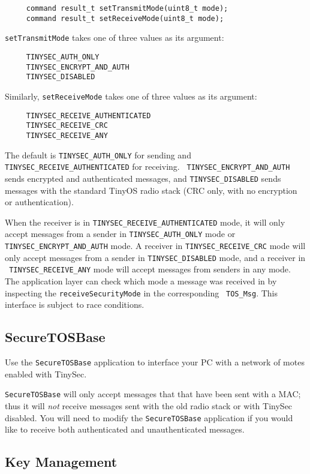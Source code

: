 \documentclass[11pt]{article}
\begin{document}
\begin{verbatim}
     command result_t setTransmitMode(uint8_t mode); 
     command result_t setReceiveMode(uint8_t mode);  
\end{verbatim} 
{\tt setTransmitMode} takes one of three values as its argument: 
\begin{verbatim}
     TINYSEC_AUTH_ONLY 
     TINYSEC_ENCRYPT_AND_AUTH
     TINYSEC_DISABLED
\end{verbatim} 
Similarly, {\tt setReceiveMode} takes one of three values as its argument: 
\begin{verbatim}
     TINYSEC_RECEIVE_AUTHENTICATED
     TINYSEC_RECEIVE_CRC
     TINYSEC_RECEIVE_ANY
\end{verbatim}
The default is {\tt TINYSEC\_AUTH\_ONLY} for sending and {\tt
  TINYSEC\_RECEIVE\_AUTHENTICATED} for receiving. {\tt
  TINYSEC\_ENCRYPT\_AND\_AUTH} sends encrypted and authenticated messages, and
  {\tt TINYSEC\_DISABLED} sends messages with the standard TinyOS radio stack
  (CRC only, with no encryption or authentication). 

When the receiver is in 
 {\tt TINYSEC\_RECEIVE\_AUTHENTICATED} mode, it will only accept messages from a
 sender in {\tt TINYSEC\_AUTH\_ONLY} mode or {\tt TINYSEC\_ENCRYPT\_AND\_AUTH}
 mode. A receiver in 
 {\tt TINYSEC\_RECEIVE\_CRC} mode will only accept messages from a
 sender in {\tt TINYSEC\_DISABLED} mode, and a receiver in  \\ {\tt
 TINYSEC\_RECEIVE\_ANY} mode will accept messages from senders in any mode. 
The application layer can check which mode a message was received in by
inspecting the {\tt receiveSecurityMode} in the corresponding {\tt
 TOS\_Msg}. This interface is subject to race conditions.

\subsection{SecureTOSBase}

Use
the {\tt SecureTOSBase} application to interface your PC with a network of
motes enabled with TinySec. 

{\tt SecureTOSBase} will only accept messages that that have been sent
with a MAC; thus it will \emph{not} receive messages sent with the old radio
stack or with TinySec disabled.  You will need to modify the
{\tt SecureTOSBase} application if you would like to receive both
authenticated and unauthenticated messages.

\subsection{Key Management}        
\label{sec:key}
\end{document}
